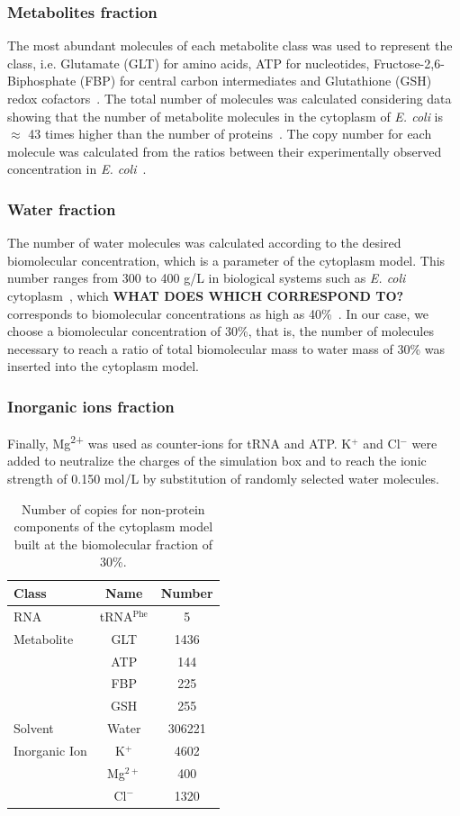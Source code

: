 \documentclass[journal=jcisd8,manuscript=article]{achemso}
\begin{document}
\subsubsection{Metabolites fraction}
The most abundant molecules of each metabolite class was used to 
represent the class, i.e. Glutamate (GLT) for amino acids, ATP for
nucleotides, Fructose-2,6-Biphosphate (FBP) for central carbon
intermediates and Glutathione (GSH) redox
cofactors~\cite{Bennett2009}. The total number of molecules was
calculated considering data showing that the number of metabolite
molecules in the cytoplasm of \textit{E. coli} is $\approx$ 43 times
higher than the number of proteins~\cite{Bennett2009}. The copy number
for each molecule was calculated from the ratios between their
experimentally observed concentration in {\em
  E. coli}~\cite{Bennett2009}.

\subsubsection{Water fraction}
The number of water molecules was calculated according to the desired
biomolecular concentration, which is a parameter of the cytoplasm
model. This number ranges from 300 to 400 g/L in biological systems
such as \textit{E. coli} cytoplasm~\cite{Zimmerman1991}, which {\bf
  WHAT DOES WHICH CORRESPOND TO?}  corresponds to biomolecular
concentrations as high as 40\%~\cite{Ellis2003a}. In our case, we
choose a biomolecular concentration of 30\%, that is, the number of
molecules necessary to reach a ratio of total biomolecular mass to
water mass of 30\% was inserted into the cytoplasm model.

\subsubsection{Inorganic ions fraction}
Finally, Mg\textsuperscript{2+} was used as counter-ions for tRNA and
ATP. K$^{+}$ and Cl$^{-}$ were added to neutralize the charges of the
simulation box and to reach the ionic strength of 0.150 mol/L by
substitution of randomly selected water molecules.



\begin{table}
\centering
\begin{tabular}{lcc}
\hline
Class & Name & Number\\
\hline
RNA & tRNA$^{\text{Phe}}$ & 5\\
\hline
Metabolite & GLT & 1436\\
  & ATP & 144\\
  & FBP & 225\\
  & GSH & 255\\
\hline
Solvent & Water & 306221\\
\hline
Inorganic Ion & K$^{+}$ & 4602\\
  & Mg$^{2+}$ & 400\\
  & Cl$^{-}$ & 1320\\
\hline
\end{tabular}
\caption{Number of copies for non-protein components of the cytoplasm model built at the biomolecular fraction of 30\%.}
\label{tbl:soup_components}
\end{table}
\end{document}
